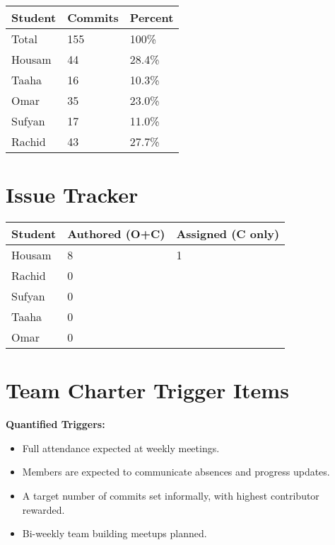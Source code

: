 \documentclass{article}
\begin{document}
\begin{table}[H]
\centering
\begin{tabular}{lll}
\toprule
\textbf{Student} & \textbf{Commits} & \textbf{Percent}\\
\midrule
Total & 155 & 100\% \\
Housam & 44 & 28.4\% \\
Taaha & 16 & 10.3\% \\
Omar & 35 & 23.0\% \\
Sufyan & 17 & 11.0\% \\
Rachid & 43 & 27.7\% \\
\bottomrule
\end{tabular}
\end{table}

\section{Issue Tracker}


\begin{table}[H]
\centering
\begin{tabular}{lll}
\toprule
\textbf{Student} & \textbf{Authored (O+C)} & \textbf{Assigned (C only)}\\
\midrule
Housam & 8 & 1 \\
Rachid & 0 \\
Sufyan & 0 \\
Taaha & 0 \\
Omar & 0 \\
\bottomrule
\end{tabular}
\end{table}


\section{Team Charter Trigger Items}

\textbf{Quantified Triggers:}
\begin{itemize}
  \item Full attendance expected at weekly meetings.
  \item Members are expected to communicate absences and progress updates.
  \item A target number of commits set informally, with highest contributor rewarded.
  \item Bi-weekly team building meetups planned.
\end{itemize}
\end{document}
